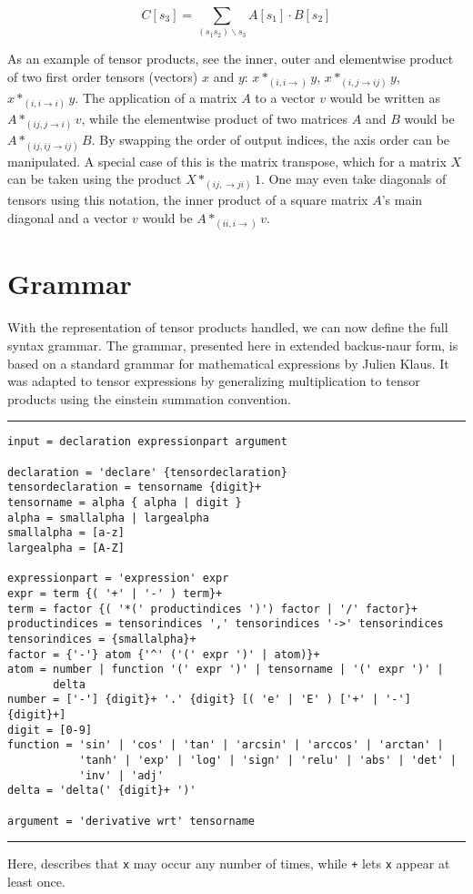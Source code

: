 \documentclass[12pt, a4paper]{report}
\begin{document}
\begin{equation}
    C[s_3] = \sum_{(s_1 s_2)  \backslash s_3} A[s_1] \cdot B[s_2]
    \label{eq:product}
\end{equation}

As an example of tensor products, see the inner, outer and elementwise product of two first order tensors (vectors) $x$ and $y$: $x*_{(i,i \rightarrow)}y$, $x*_{(i,j \rightarrow ij)}y$, $x*_{(i,i \rightarrow i)}y$.
The application of a matrix $A$ to a vector $v$ would be written as $A*_{(ij,j \rightarrow i)}v$, while the elementwise product of two matrices $A$ and $B$ would be $A*_{(ij,ij \rightarrow ij)}B$.
By swapping the order of output indices, the axis order can be manipulated.
A special case of this is the matrix transpose, which for a matrix $X$ can be taken using the product $X *_{(ij, \rightarrow ji)} 1$.
One may even take diagonals of tensors using this notation, the inner product of a square matrix $A$'s main diagonal and a vector $v$ would be $A*_{(ii,i \rightarrow)}v$.


\section{Grammar}
With the representation of tensor products handled, we can now define the full syntax grammar.
The grammar, presented here in extended backus-naur form, is based on a standard grammar for mathematical expressions by Julien Klaus. %
It was adapted to tensor expressions by generalizing multiplication to tensor products using the einstein summation convention.

\rule[-2pt]{\textwidth}{0.5pt}
{
\small
\begin{verbatim}
input = declaration expressionpart argument

declaration = 'declare' {tensordeclaration}
tensordeclaration = tensorname {digit}+
tensorname = alpha { alpha | digit }
alpha = smallalpha | largealpha
smallalpha = [a-z]
largealpha = [A-Z]

expressionpart = 'expression' expr
expr = term {( '+' | '-' ) term}+
term = factor {( '*(' productindices ')') factor | '/' factor}+
productindices = tensorindices ',' tensorindices '->' tensorindices
tensorindices = {smallalpha}+
factor = {'-'} atom {'^' ('(' expr ')' | atom)}+
atom = number | function '(' expr ')' | tensorname | '(' expr ')' | 
       delta
number = ['-'] {digit}+ '.' {digit} [( 'e' | 'E' ) ['+' | '-'] {digit}+]
digit = [0-9]
function = 'sin' | 'cos' | 'tan' | 'arcsin' | 'arccos' | 'arctan' | 
           'tanh' | 'exp' | 'log' | 'sign' | 'relu' | 'abs' | 'det' | 
           'inv' | 'adj'
delta = 'delta(' {digit}+ ')' 

argument = 'derivative wrt' tensorname
\end{verbatim}
}
\rule[8pt]{\textwidth}{0.1pt}
Here, \texttt{} describes that \texttt{x} may occur any number of times, while \texttt{+} lets \texttt{x} appear at least once.
\end{document}
